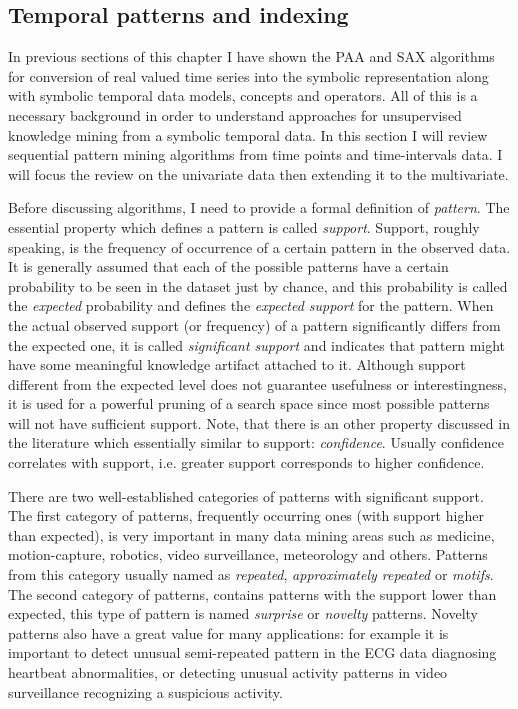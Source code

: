 \subsection{Temporal patterns and indexing} \label{tpatterns}
In previous sections of this chapter I have shown the PAA and SAX algorithms for conversion of real valued time series into the symbolic representation along with symbolic temporal data models, concepts and operators. All of this is a necessary background in order to understand approaches for unsupervised knowledge mining from a symbolic temporal data. In this section I will review sequential pattern mining algorithms from time points and time-intervals data. I will focus the review on the univariate data then extending it to the multivariate.

Before discussing algorithms, I need to provide a formal definition of \textit{pattern}. The essential property which defines a pattern is called \textit{support}. Support, roughly speaking, is the frequency of occurrence of a certain pattern in the observed data. It is generally assumed that each of the possible patterns have a certain probability to be seen in the dataset just by chance, and this probability is called the \textit{expected} probability and defines the \textit{expected support} for the pattern. When the actual observed support (or frequency) of a pattern significantly differs from the expected one, it is called \textit{significant support} and indicates that pattern might have some meaningful knowledge artifact attached to it. Although support different from the expected level does not guarantee usefulness or interestingness, it is used for a powerful pruning of a search space since most possible patterns will not have sufficient support. Note, that there is an other property \cite{citeulike:2804633} discussed in the literature which essentially similar to support: \textit{confidence}. Usually confidence correlates with support, i.e. greater support corresponds to higher confidence.

There are two well-established categories of patterns with significant support. The first category of patterns, frequently occurring ones (with support higher than expected), is very important in many data mining areas such as medicine, motion-capture, robotics, video surveillance, meteorology and others. Patterns from this category usually named as \textit{repeated}, \textit{approximately repeated} or \textit{motifs}. The second category of patterns, contains patterns with the support lower than expected, this type of pattern is named \textit{surprise} or \textit{novelty} patterns. Novelty patterns also have a great value for many applications: for example it is important to detect unusual semi-repeated pattern in the ECG data diagnosing heartbeat abnormalities, or detecting unusual activity patterns in video surveillance recognizing a suspicious activity.

